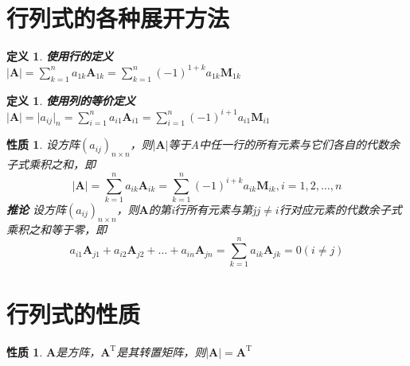 \documentclass[12pt,oneside]{ctexbook}
\newtheorem{definition}[subsection]{定义}
\newtheorem{property}[subsection]{性质}
\begin{document}
\section{行列式的各种展开方法}
\begin{definition}
    \textbf{使用行的定义}
    \\ \(\rvert\mathbf{A}\rvert=\sum\limits_{k=1}^n a_{1k}\mathbf{A}_{1k}=\sum\limits_{k=1}^n (-1)^{1+k}a_{1k}\mathbf{M}_{1k}\)
\end{definition}
\begin{definition}
    \textbf{使用列的等价定义}
    \\ \(\rvert\mathbf{A}\rvert=\rvert{a_{ij}}\rvert_n=\sum\limits_{i=1}^n a_{i1}\mathbf{A}_{i1}=\sum\limits_{i=1}^n (-1)^{i+1}a_{i1}\mathbf{M}_{i1}\)
\end{definition}
\begin{property}
    设方阵\((a_{ij})_{n \times n}\)，则\(\rvert \mathbf{A} \rvert\)等于A中任一行的所有元素与它们各自的代数余子式乘积之和，即
    \[\rvert\mathbf{A}\rvert=\sum\limits_{k=1}^n a_{ik}\mathbf{A}_{ik}=\sum\limits_{k=1}^n (-1)^{i+k}a_{ik}\mathbf{M}_{ik},
    i=1,2,\dots ,n\]
    \textbf{推论}
    设方阵\((a_{ij})_{n \times n}\)，则\(\mathbf{A}\)的第i行所有元素与第j\(j\neq i\)行对应元素的代数余子式乘积之和等于零，即
    \[a_{i1}\mathbf{A}_{j1}+a_{i2}\mathbf{A}_{j2}+ \dots + a_{in}\mathbf{A}_{jn}=\sum\limits_{k=1}^n a_{ik}\mathbf{A}_{jk}=0(i\neq j)\]
\end{property}

\section{行列式的性质}
\begin{property}
    \(\mathbf{A}\)是方阵，\(\mathbf{A}^{\mathrm{T}}\)是其转置矩阵，则\(\rvert \mathbf{A}\rvert=\mathbf{A}^{\mathrm{T}}\)
\end{property}
\end{document}
